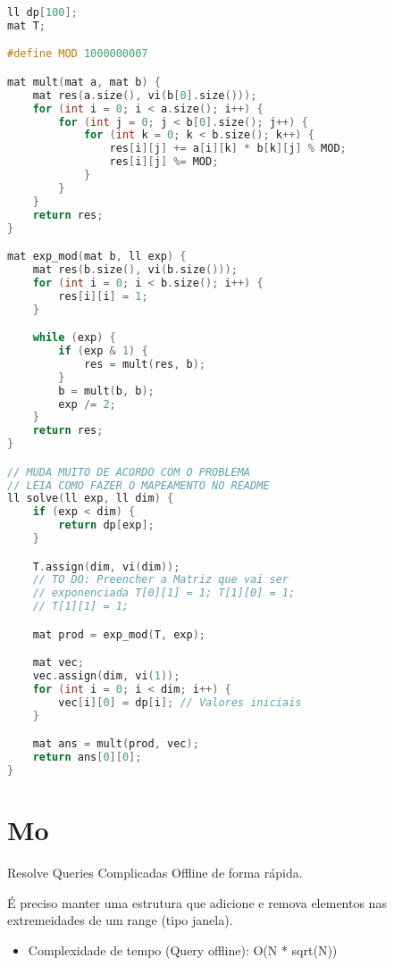 \documentclass[11pt, a4paper, oneside]{book}
\begin{document}
\begin{multicols}{2}
\begin{lstlisting}[language=C++]
ll dp[100];
mat T;

#define MOD 1000000007

mat mult(mat a, mat b) {
    mat res(a.size(), vi(b[0].size()));
    for (int i = 0; i < a.size(); i++) {
        for (int j = 0; j < b[0].size(); j++) {
            for (int k = 0; k < b.size(); k++) {
                res[i][j] += a[i][k] * b[k][j] % MOD;
                res[i][j] %= MOD;
            }
        }
    }
    return res;
}

mat exp_mod(mat b, ll exp) {
    mat res(b.size(), vi(b.size()));
    for (int i = 0; i < b.size(); i++) {
        res[i][i] = 1;
    }

    while (exp) {
        if (exp & 1) {
            res = mult(res, b);
        }
        b = mult(b, b);
        exp /= 2;
    }
    return res;
}

// MUDA MUITO DE ACORDO COM O PROBLEMA
// LEIA COMO FAZER O MAPEAMENTO NO README
ll solve(ll exp, ll dim) {
    if (exp < dim) {
        return dp[exp];
    }

    T.assign(dim, vi(dim));
    // TO DO: Preencher a Matriz que vai ser
    // exponenciada T[0][1] = 1; T[1][0] = 1;
    // T[1][1] = 1;

    mat prod = exp_mod(T, exp);

    mat vec;
    vec.assign(dim, vi(1));
    for (int i = 0; i < dim; i++) {
        vec[i][0] = dp[i]; // Valores iniciais
    }

    mat ans = mult(prod, vec);
    return ans[0][0];
}
\end{lstlisting}
\end{multicols}

\hfill

\section{Mo}


Resolve Queries Complicadas Offline de forma rápida.  



É preciso manter uma estrutura que adicione e remova elementos nas extremeidades de um range (tipo janela).



\begin{itemize}
\item Complexidade de tempo (Query offline): O(N * sqrt(N))
\end{itemize}
\end{document}
